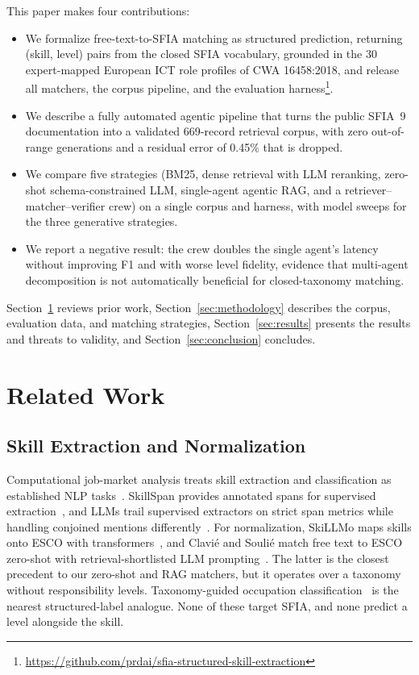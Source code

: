 \documentclass[conference]{IEEEtran}
\begin{document}
This paper makes four contributions:
\begin{itemize}
\item We formalize free-text-to-SFIA matching as structured prediction, returning (skill, level) pairs from the closed SFIA vocabulary, grounded in the 30 expert-mapped European ICT role profiles of CWA 16458:2018, and release all matchers, the corpus pipeline, and the evaluation harness\footnote{\url{https://github.com/prdai/sfia-structured-skill-extraction}}.
\item We describe a fully automated agentic pipeline that turns the public SFIA~9 documentation into a validated 669-record retrieval corpus, with zero out-of-range generations and a residual error of 0.45\% that is dropped.
\item We compare five strategies (BM25, dense retrieval with LLM reranking, zero-shot schema-constrained LLM, single-agent agentic RAG, and a retriever--matcher--verifier crew) on a single corpus and harness, with model sweeps for the three generative strategies.
\item We report a negative result: the crew doubles the single agent's latency without improving F1 and with worse level fidelity, evidence that multi-agent decomposition is not automatically beneficial for closed-taxonomy matching.
\end{itemize}

Section~\ref{sec:related} reviews prior work, Section~\ref{sec:methodology} describes the corpus, evaluation data, and matching strategies, Section~\ref{sec:results} presents the results and threats to validity, and Section~\ref{sec:conclusion} concludes.

\section{Related Work}\label{sec:related}

\subsection{Skill Extraction and Normalization}
Computational job-market analysis treats skill extraction and classification as established NLP tasks~\cite{senger2024survey}. SkillSpan provides annotated spans for supervised extraction~\cite{zhang2022skillspan}, and LLMs trail supervised extractors on strict span metrics while handling conjoined mentions differently~\cite{nguyen2024rethinking}. For normalization, SkiLLMo maps skills onto ESCO with transformers~\cite{skillmo2025}, and Clavi\'e and Souli\'e match free text to ESCO zero-shot with retrieval-shortlisted LLM prompting~\cite{clavie2023esco}. The latter is the closest precedent to our zero-shot and RAG matchers, but it operates over a taxonomy without responsibility levels. Taxonomy-guided occupation classification~\cite{achananuparp2026taxonomy} is the nearest structured-label analogue. None of these target SFIA, and none predict a level alongside the skill.
\end{document}
